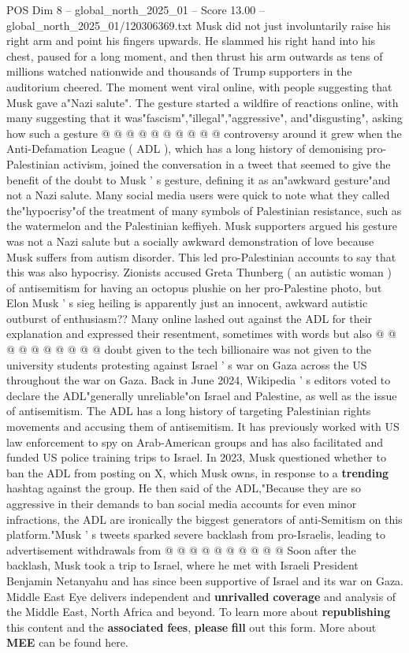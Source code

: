 \begin{textsample}{POS Dim 8 – global\_north\_2025\_01 – Score 13.00 – global\_north\_2025\_01/120306369.txt}
Musk did not just involuntarily raise his right arm and point his fingers upwards.
He slammed his right hand into his chest, paused for a long moment, and then thrust his arm outwards as tens of millions watched nationwide and thousands of Trump supporters in the auditorium cheered.
The moment went viral online, with people suggesting that Musk gave a"Nazi salute".
The gesture started a wildfire of reactions online, with many suggesting that it was"fascism","illegal","aggressive", and"disgusting", asking how such a gesture @ @ @ @ @ @ @ @ @ @ controversy around it grew when the Anti-Defamation League ( ADL ), which has a long history of demonising pro-Palestinian activism, joined the conversation in a tweet that seemed to give the benefit of the doubt to Musk ' s gesture, defining it as an"awkward gesture"and not a Nazi salute.
Many social media users were quick to note what they called the"hypocrisy"of the treatment of many symbols of Palestinian resistance, such as the watermelon and the Palestinian keffiyeh.
Musk supporters argued his gesture was not a Nazi salute but a socially awkward demonstration of love because Musk suffers from autism disorder.
This led pro-Palestinian accounts to say that this was also hypocrisy.
Zionists accused Greta Thunberg ( an autistic woman ) of antisemitism for having an octopus plushie on her pro-Palestine photo, but Elon Musk ' s sieg heiling is apparently just an innocent, awkward autistic outburst of enthusiasm??
Many online lashed out against the ADL for their explanation and expressed their resentment, sometimes with words but also @ @ @ @ @ @ @ @ @ @ doubt given to the tech billionaire was not given to the university students protesting against Israel ' s war on Gaza across the US throughout the war on Gaza.
Back in June 2024, Wikipedia ' s editors voted to declare the ADL"generally unreliable"on Israel and Palestine, as well as the issue of antisemitism.
The ADL has a long history of targeting Palestinian rights movements and accusing them of antisemitism.
It has previously worked with US law enforcement to spy on Arab-American groups and has also facilitated and funded US police training trips to Israel.
In 2023, Musk questioned whether to ban the ADL from posting on X, which Musk owns, in response to a \textbf{trending} hashtag against the group.
He then said of the ADL,"Because they are so aggressive in their demands to ban social media accounts for even minor infractions, the ADL are ironically the biggest generators of anti-Semitism on this platform."Musk ' s tweets sparked severe backlash from pro-Israelis, leading to advertisement withdrawals from @ @ @ @ @ @ @ @ @ @ Soon after the backlash, Musk took a trip to Israel, where he met with Israeli President Benjamin Netanyahu and has since been supportive of Israel and its war on Gaza.
Middle East Eye delivers independent and \textbf{unrivalled} \textbf{coverage} and analysis of the Middle East, North Africa and beyond.
To learn more about \textbf{republishing} this content and the \textbf{associated} \textbf{fees}, \textbf{please} \textbf{fill} out this form.
More about \textbf{MEE} can be found here.


\end{textsample}
